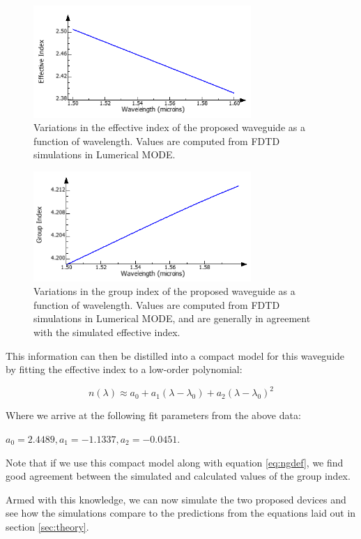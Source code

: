 \documentclass[journal]{IEEEtran}
\begin{document}
\begin{figure}[t!]
  \centering
  \includegraphics[width = 3.25in]{fig/waveguide_dispersion_narrow.png}
  \caption{Variations in the effective index of the proposed waveguide as a function of wavelength. Values are computed from FDTD simulations in Lumerical MODE.}
  \label{fig:neff}
\end{figure}


\begin{figure}[t!]
  \centering
  \includegraphics[width = 3.25in]{fig/group_index_narrow.png}
  \caption{Variations in the group index of the proposed waveguide as a function of wavelength. Values are computed from FDTD simulations in Lumerical MODE, and are generally in agreement with the simulated effective index.}
  \label{fig:ng}
\end{figure}

This information can then be distilled into a compact model for this waveguide by fitting the effective index to a low-order polynomial:

\begin{equation}
n(\lambda)\approx a_0 + a_1(\lambda - \lambda_0) + a_2(\lambda - \lambda_0)^2
\end{equation}

Where we arrive at the following fit parameters from the above data:

$ a_0 = 2.4489, a_1 = -1.1337, a_2 = -0.0451 $.

Note that if we use this compact model along with equation \ref{eq:ngdef}, we find good agreement between the simulated and calculated values of the group index.

Armed with this knowledge, we can now simulate the two proposed devices and see how the simulations compare to the predictions from the equations laid out in section \ref{sec:theory}.
\end{document}
